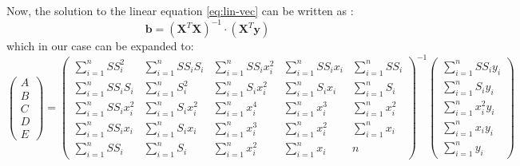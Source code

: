 Now, the solution to the linear equation \ref{eq:lin-vec} can be written as \cite{lin-reg}:
\begin{equation}
	\boldsymbol{b}=\left(\boldsymbol{X}^T\boldsymbol{X}\right)^{-1}\cdot (\boldsymbol{X}^T\boldsymbol{y})
\end{equation}
which in our case can be expanded to:
\begin{equation}
	\label{eq:lin-reg}
	\begin{pmatrix}
		A \\
		B \\
		C \\
		D \\
		E  
	\end{pmatrix} 
	=
	\begin{pmatrix}
		\sum\limits_{i=1}^nSS_i^2 & \sum\limits_{i=1}^nSS_iS_i & \sum\limits_{i=1}^nSS_ix_i^2 & \sum\limits_{i=1}^nSS_ix_i & \sum\limits_{i=1}^nSS_i \\
		\sum\limits_{i=1}^nSS_iS_i & \sum\limits_{i=1}^nS_i^2 & \sum\limits_{i=1}^nS_ix_i^2 & \sum\limits_{i=1}^nS_ix_i & \sum\limits_{i=1}^nS_i \\
		\sum\limits_{i=1}^nSS_ix_i^2 & \sum\limits_{i=1}^nS_ix_i^2 & \sum\limits_{i=1}^nx_i^4 & \sum\limits_{i=1}^nx_i^3 & \sum\limits_{i=1}^nx_i^2 \\
		\sum\limits_{i=1}^nSS_ix_i & \sum\limits_{i=1}^nS_ix_i & \sum\limits_{i=1}^nx_i^3 & \sum\limits_{i=1}^nx_i^2 & \sum\limits_{i=1}^nx_i \\
		\sum\limits_{i=1}^nSS_i & \sum\limits_{i=1}^nS_i & \sum\limits_{i=1}^nx_i^2 & \sum\limits_{i=1}^nx_i & n  
	\end{pmatrix}^{-1}
	\begin{pmatrix}
		\sum\limits_{i=1}^nSS_iy_i \\
		\sum\limits_{i=1}^nS_iy_i \\
		\sum\limits_{i=1}^nx_i^2y_i \\
		\sum\limits_{i=1}^nx_iy_i \\
		\sum\limits_{i=1}^ny_i  
	\end{pmatrix}
\end{equation}

